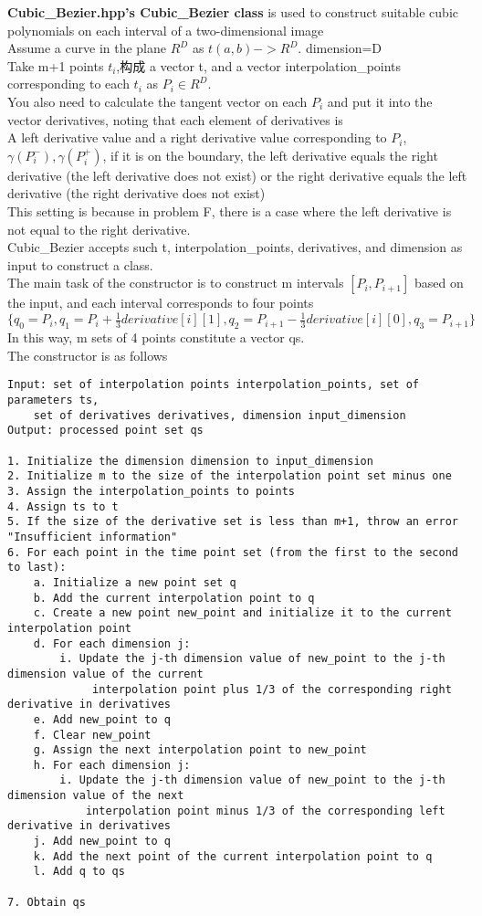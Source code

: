 \documentclass[a4paper]{article}
\begin{document}
\textbf{Cubic\_Bezier.hpp's Cubic\_Bezier class} is used to construct suitable cubic polynomials on each interval of a two-dimensional image \\
Assume a curve in the plane $R^D$ as $t (a,b)->R^D$.
dimension=D \\
Take m+1 points $t_i$,构成 a vector t, and a vector interpolation\_points corresponding to each $t_i$ as $P_i \in R^D$. \\
You also need to calculate the tangent vector on each $P_i$ and put it into the vector derivatives, noting that each element of derivatives is \\
A left derivative value and a right derivative value corresponding to $P_i$, $\gamma(P_i^{-}),\gamma(P_i^{+})$, if it is on the boundary, the left derivative equals the right derivative (the left derivative does not exist) or the right derivative equals the left derivative (the right derivative does not exist) \\
This setting is because in problem F, there is a case where the left derivative is not equal to the right derivative. \\
Cubic\_Bezier accepts such t, interpolation\_points, derivatives, and dimension as input to construct a class. \\
The main task of the constructor is to construct m intervals $[P_i,P_{i+1}]$ based on the input, and each interval corresponds to four points $\{q_0=P_i,q_1=P_i+\frac{1}{3}derivative[i][1],q_2=P_{i+1}-\frac{1}{3}derivative[i][0],q_3=P_{i+1}\}$ \\
In this way, m sets of 4 points constitute a vector qs. \\
The constructor is as follows \\
\begin{verbatim}
Input: set of interpolation points interpolation_points, set of parameters ts, 
    set of derivatives derivatives, dimension input_dimension
Output: processed point set qs

1. Initialize the dimension dimension to input_dimension
2. Initialize m to the size of the interpolation point set minus one
3. Assign the interpolation_points to points
4. Assign ts to t
5. If the size of the derivative set is less than m+1, throw an error "Insufficient information"
6. For each point in the time point set (from the first to the second to last):
    a. Initialize a new point set q
    b. Add the current interpolation point to q
    c. Create a new point new_point and initialize it to the current interpolation point
    d. For each dimension j:
        i. Update the j-th dimension value of new_point to the j-th dimension value of the current
             interpolation point plus 1/3 of the corresponding right derivative in derivatives
    e. Add new_point to q
    f. Clear new_point
    g. Assign the next interpolation point to new_point
    h. For each dimension j:
        i. Update the j-th dimension value of new_point to the j-th dimension value of the next 
            interpolation point minus 1/3 of the corresponding left derivative in derivatives
    j. Add new_point to q
    k. Add the next point of the current interpolation point to q
    l. Add q to qs

7. Obtain qs
\end{verbatim}
\end{document}
